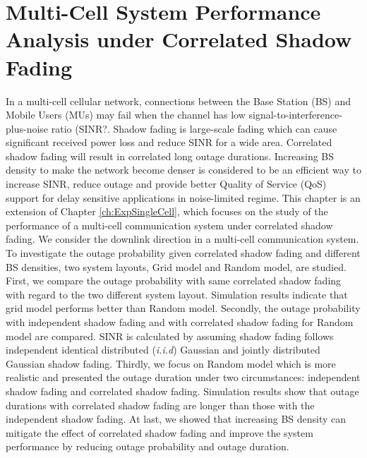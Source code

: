 \chapter{Multi-Cell System Performance Analysis under Correlated Shadow Fading}\label{ch:Multi}
\par In a multi-cell cellular network, connections between the Base Station (BS) and Mobile Users (MUs) may fail when the channel has low signal-to-interference-plus-noise ratio (SINR?. Shadow fading is large-scale fading which can cause significant received power loss and reduce SINR for a wide area. Correlated shadow fading will result in correlated long outage durations. Increasing BS density to make the network become denser is considered to be an efficient way to increase SINR, reduce outage and provide better Quality of Service (QoS) support for delay sensitive applications in noise-limited regime. This chapter is an extension of Chapter \ref{ch:ExpSingleCell}, which focuses on the study of the performance of a multi-cell communication system under correlated shadow fading. We consider the downlink direction in a multi-cell communication system. To investigate the outage probability given correlated shadow fading and different BS densities, two system layouts, Grid model and Random model, are studied. First, we compare the outage probability with same correlated shadow fading with regard to the two different system layout. Simulation results indicate that grid model performs better than Random model. Secondly, the outage probability with independent shadow fading and with correlated shadow fading for Random model are compared. SINR is calculated by assuming shadow fading follows independent identical distributed (\emph{i.i.d}) Gaussian and jointly distributed Gaussian shadow fading. Thirdly, we focus on Random model which is more realistic and presented the outage duration under two circumstances: independent shadow fading and correlated shadow fading. Simulation results show that outage durations with correlated shadow fading are longer than those with the independent shadow fading. At last, we showed that increasing BS density can mitigate the effect of correlated shadow fading and improve the system performance by reducing outage probability and outage duration. 
